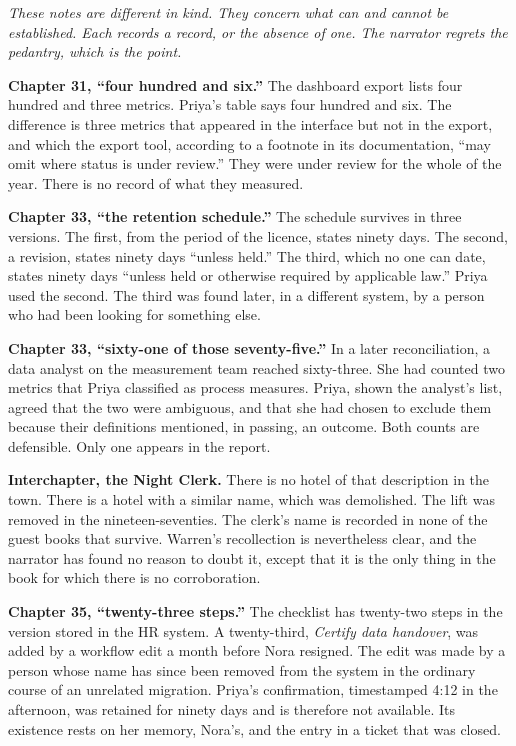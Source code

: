 {\small

\emph{These notes are different in kind. They concern what can and cannot be established. Each records a record, or the absence of one. The narrator regrets the pedantry, which is the point.}

\textbf{Chapter 31, ``four hundred and six.''} The dashboard export lists four hundred and three metrics. Priya's table says four hundred and six. The difference is three metrics that appeared in the interface but not in the export, and which the export tool, according to a footnote in its documentation, ``may omit where status is under review.'' They were under review for the whole of the year. There is no record of what they measured.

\textbf{Chapter 33, ``the retention schedule.''} The schedule survives in three versions. The first, from the period of the licence, states ninety days. The second, a revision, states ninety days ``unless held.'' The third, which no one can date, states ninety days ``unless held or otherwise required by applicable law.'' Priya used the second. The third was found later, in a different system, by a person who had been looking for something else.

\textbf{Chapter 33, ``sixty-one of those seventy-five.''} In a later reconciliation, a data analyst on the measurement team reached sixty-three. She had counted two metrics that Priya classified as process measures. Priya, shown the analyst's list, agreed that the two were ambiguous, and that she had chosen to exclude them because their definitions mentioned, in passing, an outcome. Both counts are defensible. Only one appears in the report.

\textbf{Interchapter, the Night Clerk.} There is no hotel of that description in the town. There is a hotel with a similar name, which was demolished. The lift was removed in the nineteen-seventies. The clerk's name is recorded in none of the guest books that survive. Warren's recollection is nevertheless clear, and the narrator has found no reason to doubt it, except that it is the only thing in the book for which there is no corroboration.

\textbf{Chapter 35, ``twenty-three steps.''} The checklist has twenty-two steps in the version stored in the HR system. A twenty-third, \emph{Certify data handover}, was added by a workflow edit a month before Nora resigned. The edit was made by a person whose name has since been removed from the system in the ordinary course of an unrelated migration. Priya's confirmation, timestamped 4:12 in the afternoon, was retained for ninety days and is therefore not available. Its existence rests on her memory, Nora's, and the entry in a ticket that was closed.

}
